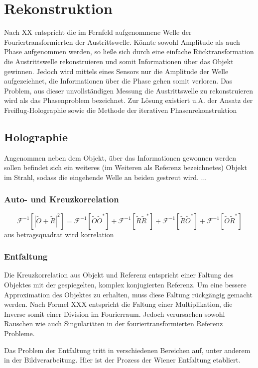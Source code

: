 \chapter{Rekonstruktion}
Nach XX entspricht die im Fernfeld aufgenommene Welle der Fouriertransformierten der Austrittswelle. Könnte sowohl Amplitude als auch Phase aufgenommen werden, so ließe sich durch eine einfache Rücktransformation die Austrittswelle rekonstruieren und somit Informationen über das Objekt gewinnen. Jedoch wird mittels eines Sensors nur die Amplitude der Welle aufgezeichnet, die Informationen über die Phase gehen somit verloren. Das Problem, aus dieser unvollständigen Messung die Austrittswelle zu rekonstruieren wird als das Phasenproblem bezeichnet. Zur Lösung existiert u.A. der Ansatz der Freiflug-Holographie sowie die Methode der iterativen Phasenrekonstruktion
\section{Holographie}
Angenommen neben dem Objekt, über das Informationen gewonnen werden sollen befindet sich ein weiteres (im Weiteren als Referenz bezeichnetes) Objekt im Strahl, sodass die eingehende Welle an beiden gestreut wird. ...
\subsection{Auto- und Kreuzkorrelation}
\begin{equation}
	\mathscr{F}^{-1}\left[\left|\tilde{O}+\tilde{R}\right|^2\right]=
	\mathscr{F}^{-1}\left[\tilde{O}\tilde{O}^*\right]+
	\mathscr{F}^{-1}\left[\tilde{R}\tilde{R}^*\right]+
	\mathscr{F}^{-1}\left[\tilde{R}\tilde{O}^*\right]+
		\mathscr{F}^{-1}\left[\tilde{O}\tilde{R}^*\right]
\end{equation}
aus betragsquadrat wird korrelation 
\subsection{Entfaltung}
Die Kreuzkorrelation aus Objekt und Referenz entspricht einer Faltung des Objektes mit der gespiegelten, komplex konjugierten Referenz. Um eine bessere Approximation des Objektes zu erhalten, muss diese Faltung rückgängig gemacht werden. Nach Formel XXX entspricht die Faltung einer Multiplikation, die Inverse somit einer Division im Fourierraum. Jedoch verursachen sowohl Rauschen wie auch Singulariäten in der fouriertransformierten Referenz Probleme.

Das Problem der Entfaltung tritt in verschiedenen Bereichen auf, unter anderem in der Bildverarbeitung.
Hier ist der Prozess der Wiener Entfaltung etabliert. 



